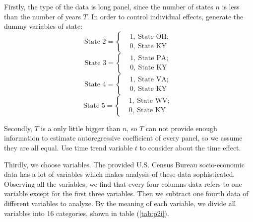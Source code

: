 \documentclass{mcmthesis}
\numberwithin{equation}{section}
\numberwithin{figure}{section}
\numberwithin{table}{section}
\theoremstyle{mydef}
\begin{document}
Firstly, the type of the data is long panel, since the number of states $n$ is less than the number of years $T$. In order to control individual effects, generate the dummy variables of state\cite{b5}:
\begin{equation}
\text{State 2}=
\left\{
\begin{aligned}
&1,\ \text{State OH; }\\
&0,\ \text{State KY}
\end{aligned}
\right.
\end{equation}
\begin{equation}
\text{State 3}=
\left\{
\begin{aligned}
&1,\ \text{State PA; }\\
&0,\ \text{State KY}
\end{aligned}
\right.
\end{equation}
\begin{equation}
\text{State 4}=
\left\{
\begin{aligned}
&1,\ \text{State VA; }\\
&0,\ \text{State KY}
\end{aligned}
\right.
\end{equation}
\begin{equation}
\text{State 5}=
\left\{
\begin{aligned}
&1,\ \text{State WV; }\\
&0,\ \text{State KY}
\end{aligned}
\right.
\end{equation}

Secondly, $T$ is a only little bigger than $n$, so $T$ can not provide enough information to estimate autoregressive coefficient of every panel, so we assume they are all equal\cite{b6}. Use time trend variable $t$ to consider about the time effect.

Thirdly, we choose variables. The provided U.S. Census Bureau socio-economic data has a lot of variables which makes analysis of these data sophisticated. Observing all the variables, we find that every four columns data refers to one variable except for the first three variables. Then we subtract one fourth data of different variables to analyze. By the meaning of each variable, we divide all variables into 16 categories, shown in table (\ref{tab:p2i}).
\end{document}
